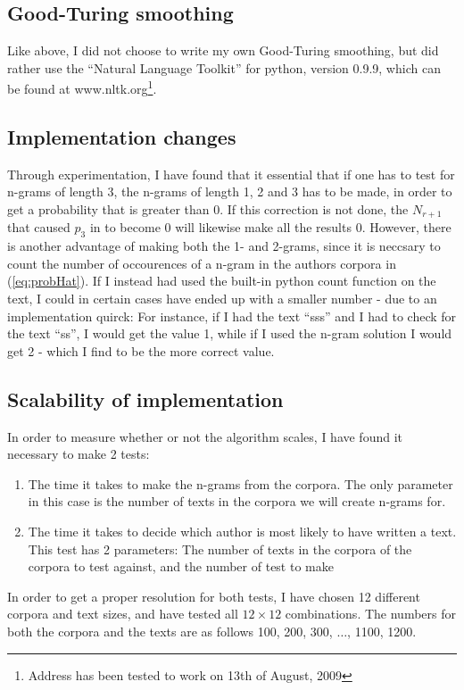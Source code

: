 \subsection{Good-Turing smoothing}
Like above, I did not choose to write my own Good-Turing smoothing, but did rather use the ``Natural Language Toolkit'' for python, version 0.9.9, which can be found at www.nltk.org\footnote{Address has been tested to work on 13th of August, 2009}.

\subsection{Implementation changes}
Through experimentation, I have found that it essential that if one has to test for n-grams of length 3, the n-grams of length 1, 2 and 3 has to be made, in order to get a probability that is greater than 0. If this correction is not done, the $N_{r+1}$ that caused $p_3$ in  to become 0 will likewise make all the results 0. However, there is another advantage of making both the 1- and 2-grams, since it is neccsary to count the number of occourences of a n-gram in the authors corpora in (\ref{eq:probHat}). If I instead had used the built-in python count function on the text, I could in certain cases have ended up with a smaller number - due to an implementation quirck: For instance, if I had the text ``sss'' and I had to check for the text ``ss'', I would get the value 1, while if I used the n-gram solution I would get 2 - which I find to be the more correct value.

\subsection{Scalability of implementation}
In order to measure whether or not the algorithm scales, I have found it necessary to make 2 tests: 
\begin{enumerate}
\item The time it takes to make the n-grams from the corpora. The only parameter in this case is the number of texts in the corpora we will create n-grams for.
\item The time it takes to decide which author is most likely to have written a text. This test has 2 parameters: The number of texts in the corpora of the corpora to test against, and the number of test to make
\end{enumerate}

In order to get a proper resolution for both tests, I have chosen 12 different corpora and text sizes, and have tested all $12 \times 12$ combinations. The numbers for both the corpora and the texts are as follows 100, 200, 300, $\ldots$, 1100, 1200.\\

